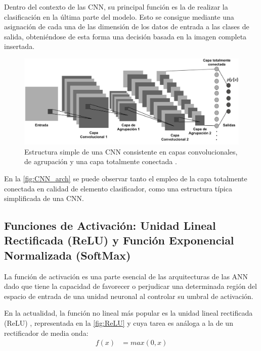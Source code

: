 Dentro del contexto de las CNN, su principal función es la de realizar la clasificación en la última parte del modelo. Esto se consigue mediante una asignación de cada una de las dimensión de los datos de entrada a las clases de salida, obteniéndose de esta forma una decisión basada en la imagen completa insertada.

\begin{figure}
    \centering
    \includegraphics[width=\textwidth]{Images/CNN_architecture.png}
    \caption{Estructura simple de una CNN consistente en capas convolucionales, de agrupación y una capa totalmente conectada \cite{ArchitectureCNN}.}
    \label{fig:CNN_arch}
\end{figure}

En la \autoref{fig:CNN_arch} se puede observar tanto el empleo de la capa totalmente conectada en calidad de elemento clasificador, como una estructura típica simplificada de una CNN.

\subsection{Funciones de Activación: Unidad Lineal Rectificada (ReLU) y Función Exponencial Normalizada (SoftMax) }

La función de activación es una parte esencial de las arquitecturas de las ANN dado que tiene la capacidad de favorecer o perjudicar una determinada región del espacio de entrada de una unidad neuronal al controlar su umbral de activación.

En la actualidad, la función no lineal más popular es la unidad lineal rectificada (ReLU) \cite{DeepLearning}, representada en la \autoref{fig:ReLU} y cuya tarea es análoga a la de un rectificador de media onda:
\begin{align*}
    f(x) &= max(0, x) 
\end{align*}

